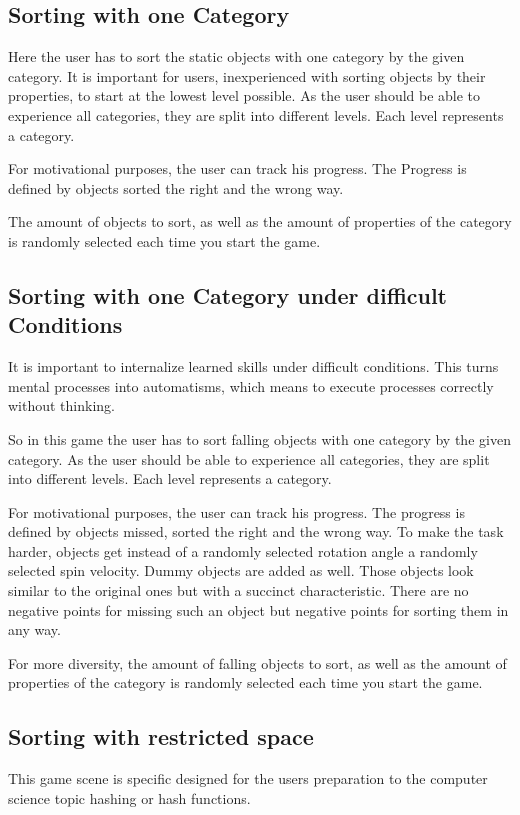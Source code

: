\subsection{Sorting with one Category}\label{subsec:sorting-with-one-category}
Here the user has to sort the static objects with one category by the given category.
It is important for users, inexperienced with sorting objects by their properties, to start at the lowest level possible.
As the user should be able to experience all categories, they are split into different levels.
Each level represents a category.

For motivational purposes, the user can track his progress.
The Progress is defined by objects sorted the right and the wrong way.

The amount of objects to sort, as well as the amount of properties of the category
is randomly selected each time you start the game.

\subsection{Sorting with one Category under difficult Conditions}\label{subsec:sorting-with-one-category-under-difficult-conditions}
It is important to internalize learned skills under difficult conditions.
This turns mental processes into automatisms, which means to execute processes correctly without thinking.

So in this game the user has to sort falling objects with one category by the given category.
As the user should be able to experience all categories, they are split into different levels.
Each level represents a category.

For motivational purposes, the user can track his progress.
The progress is defined by objects missed, sorted the right and the wrong way.
To make the task harder, objects get instead of a randomly selected rotation angle a randomly selected spin velocity.
Dummy objects are added as well.
Those objects look similar to the original ones but with a succinct characteristic.
There are no negative points for missing such an object but negative points for sorting them in any way.

For more diversity, the amount of falling objects to sort, as well as the amount of properties of the category
is randomly selected each time you start the game.

\subsection{Sorting with restricted space}\label{subsec:sorting-with-restricted-space}
This game scene is specific designed for the users preparation to the computer science topic hashing or hash functions.

